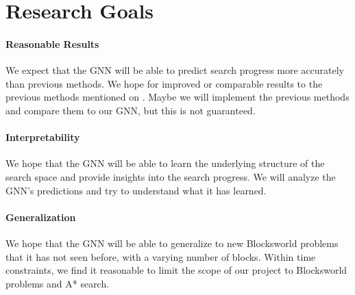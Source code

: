 \documentclass[11pt]{article}
\begin{document}

\section{Research Goals}

\paragraph{Reasonable Results} We expect that the GNN will be able to predict search progress more accurately than previous methods. We hope for improved or comparable results to the previous methods mentioned on \citet{sudry2022learning}. Maybe we will implement the previous methods and compare them to our GNN, but this is not guaranteed.

\paragraph{Interpretability} We hope that the GNN will be able to learn the underlying structure of the search space and provide insights into the search progress. We will analyze the GNN's predictions and try to understand what it has learned.

\paragraph{Generalization} We hope that the GNN will be able to generalize to new Blocksworld problems that it has not seen before, with a varying number of blocks. Within time constraints, we find it reasonable to limit the scope of our project to Blocksworld problems and A* search. 


\end{document}
